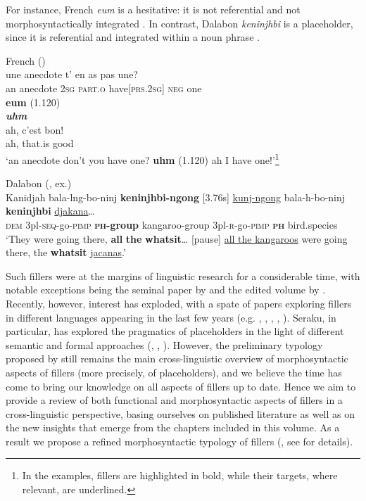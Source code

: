 \documentclass[output=paper]{langscibook}
\begin{document}
For instance, French \textit{eum} is a hesitative: it is not referential and not morphosyntactically integrated . In contrast, Dalabon \textit{keninjhbi} \textup{is a placeholder, since it is referential and integrated within a noun phrase} .

\ea\label{ex:intro:1}
{French (\citealt[7]{KosmalaCrible2022})}\\
\gll une anecdote t’ en as pas une?\\
     an anecdote \textsc{2sg} \textsc{part.o} have[\textsc{prs.2sg}] \textsc{neg} one {}\\
\gll \textbf{eum} (1.120)\\
     \textbf{\textit{uhm}} {}\\
\gll ah, c’est bon!\\
     ah, that.is good {}\\
\glt ‘an anecdote don’t you have one? \textbf{uhm} (1.120) ah I have one!’\footnote{In the examples, fillers are highlighted in bold, while their targets, where relevant, are underlined.}
\z

\ea\label{ex:intro:2}
{Dalabon (\citealt[\pageref{ex:ponsonnet:9}]{chapters/ponsonnet}, ex.)}\\
\gll Kanidjah   bala-lng-bo-ninj \textbf{keninjhbi-ngong}    [3.76s]    \uline{kunj-ngong} bala-h-bo-ninj    \textbf{keninjhbi}     \uline{djakana}…\\
     \textsc{dem}    3pl-\textsc{seq}-go-\textsc{pimp} \textbf{\textsc{ph}-group}   {}   kangaroo-group 3pl-\textsc{r}-go-\textsc{pimp}    \textbf{\textsc{ph}}    bird.species\\
\glt ‘They were going there, \textbf{all} \textbf{the} \textbf{whatsit}… [pause] \uline{all the kangaroos} were going there, the \textbf{whatsit} \uline{jacanas}.’
\z

Such fillers were at the margins of linguistic research for a considerable time, with notable exceptions being the seminal paper by \citet{Hayashi2006} and the edited volume by \citet{Amiridze2010}. Recently, however, interest has exploded, with a spate of papers exploring fillers in different languages appearing in the last few years (e.g. \citealt{Seraku2020}, \citealt{Hennecke2022}, \citealt{Klyachko2022}, \citealt{Nagaya2022}, \citealt{Vallejos-yopan2023}). Seraku, in particular, has explored the pragmatics of placeholders in the light of different semantic and formal approaches (\citealt{Seraku2022a}, \citeyear{Seraku2022b}, \citeyear{Seraku2023,Seraku2024}). However, the preliminary typology proposed by \citet{Podlesskaya2010} still remains the main cross-linguistic overview of morphosyntactic aspects of fillers (more precisely, of placeholders), and we believe the time has come to bring our knowledge on all aspects of fillers up to date. Hence we aim to provide a review of both functional and morphosyntactic aspects of fillers in a cross-linguistic perspective, basing ourselves on published literature as well as on the new insights that emerge from the chapters included in this volume. As a result we propose a refined morphosyntactic typology of fillers (, see  for details).
\end{document}
